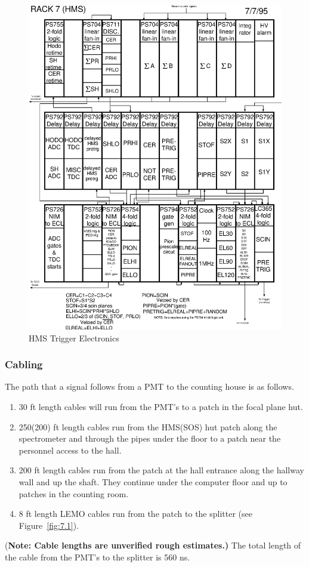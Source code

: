 \begin{figure}
\includegraphics[width=5.8in]{hms_crates}
\caption{HMS Trigger Electronics\label{fig:hms_trig_logic}}
\end{figure}
\clearpage

\subsubsection{Cabling}

The path that a signal follows from a PMT to the counting house is as
follows.
\begin{enumerate}
\item 30 ft length cables will run from the PMT's to a patch in the focal
plane hut.
\item 250(200) ft length cables run from the HMS(SOS) hut patch along the
spectrometer and through the pipes
under the floor to a patch near the personnel access to the hall.
\item 200 ft length cables run from the patch at the hall entrance
along the hallway wall and up the shaft.  They continue under the
computer floor and up to patches in the counting room.
\item 8 ft length LEMO cables run from the patch to the splitter (see
Figure~\ref{fig:7.1}).
\end{enumerate}
{(\bf Note: Cable lengths are unverified rough estimates.)}
The total length of the cable from the PMT's to the splitter is 560 ns.

